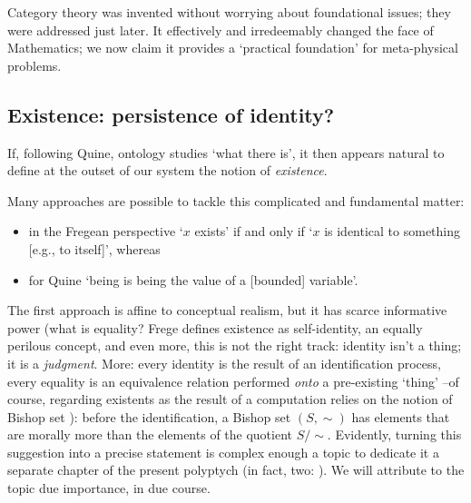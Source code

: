 Category theory was invented without worrying about foundational issues; they were addressed just later. It effectively and irredeemably changed the face of Mathematics; we now claim it provides a `practical foundation' for meta\hyp{}physical problems.%
\subsection{Existence: persistence of identity?} \label{existence}
If, following Quine, ontology studies `what there is', it then appears natural to define at the outset of our system the notion of \emph{existence}.

Many approaches are possible to tackle this complicated and fundamental matter: 
\begin{itemize}
    \item in the Fregean perspective \cite{Frege} `$x$ exists' if and only if `$x$ is identical to something [e.g., to itself]', whereas 
    \item for Quine \cite{Qui53} `being is being the value of a [bounded] variable'.
\end{itemize}
The first approach is affine to conceptual realism, but it has scarce informative power (what is equality? Frege defines existence as self-identity, an equally perilous concept, and even more, this is not the right track: identity isn't a thing; it is a \emph{judgment}. More: every identity is the result of an identification process, every equality is an equivalence relation performed \emph{onto} a pre-existing `thing' --of course, regarding existents as the result of a computation relies on the notion of Bishop set \cite{Bis67,hofmann2012extensional}): before the identification, a Bishop set $(S,\sim)$ has elements that are morally more than the elements of the quotient $S/\!\sim$. Evidently, turning this suggestion into a precise statement is complex enough a topic to dedicate it a separate chapter of the present polyptych (in fact, two: \cite{black,homot}). We will attribute to the topic due importance, in due course.

